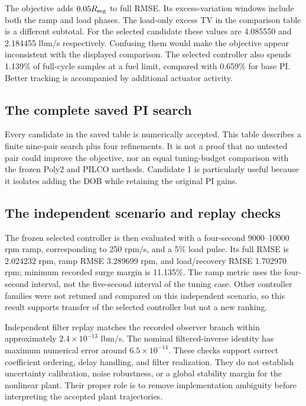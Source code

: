 The objective adds $0.05R_{\rm seg}$ to full RMSE. Its excess-variation windows include both the ramp and load phases. The load-only excess TV in the comparison table is a different subtotal. For the selected candidate these values are 4.085550 and 2.184455 lbm/s respectively. Confusing them would make the objective appear inconsistent with the displayed comparison. The selected controller also spends 1.139\% of full-cycle samples at a fuel limit, compared with 0.659\% for base PI. Better tracking is accompanied by additional actuator activity.

\subsection{The complete saved PI search}

Every candidate in the saved table is numerically accepted. This table describes a finite nine-pair search plus four refinements. It is not a proof that no untested pair could improve the objective, nor an equal tuning-budget comparison with the frozen Poly2 and PILCO methods. Candidate 1 is particularly useful because it isolates adding the DOB while retaining the original PI gains.

\subsection{The independent scenario and replay checks}
The frozen selected controller is then evaluated with a four-second 9000--10000 rpm ramp, corresponding to 250 rpm/s, and a 5\% load pulse. Its full RMSE is 2.024232 rpm, ramp RMSE 3.289699 rpm, and load/recovery RMSE 1.702970 rpm; minimum recorded surge margin is 11.135\%. The ramp metric uses the four-second interval, not the five-second interval of the tuning case. Other controller families were not retuned and compared on this independent scenario, so this result supports transfer of the selected controller but not a new ranking.

Independent filter replay matches the recorded observer branch within approximately $2.4\times10^{-13}$ lbm/s. The nominal filtered-inverse identity has maximum numerical error around $6.5\times10^{-14}$. These checks support correct coefficient ordering, delay handling, and filter realization. They do not establish uncertainty calibration, noise robustness, or a global stability margin for the nonlinear plant. Their proper role is to remove implementation ambiguity before interpreting the accepted plant trajectories.


